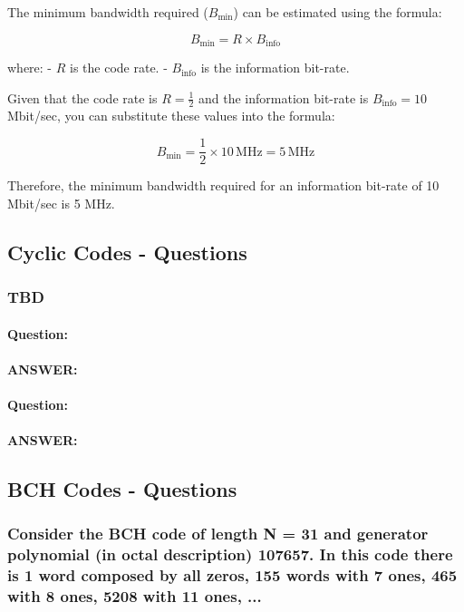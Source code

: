 \documentclass[colorlinks,11pt,a4paper,normalphoto,withhyper,ragged2e]{altareport}
\begin{document}
		
		The minimum bandwidth required (\( B_{\text{min}} \)) can be estimated using the formula:
		
		\[ B_{\text{min}} = R \times B_{\text{info}} \]
		
		where:
		- \( R \) is the code rate.
		- \( B_{\text{info}} \) is the information bit-rate.
		
		Given that the code rate is \( R = \frac{1}{2} \) and the information bit-rate is \( B_{\text{info}} = 10 \) Mbit/sec, you can substitute these values into the formula:
		
		\[ B_{\text{min}} = \frac{1}{2} \times 10 \, \text{MHz} = 5 \, \text{MHz} \]
		
		Therefore, the minimum bandwidth required for an information bit-rate of 10 Mbit/sec is 5 MHz.
		
		
		
		
		
		
		
		
		\subsection{Cyclic Codes - Questions}
			
			\subsubsection{TBD}
				
				
				\paragraph{Question: }
				\paragraph{ANSWER:}
				
				
				
				\paragraph{Question: }
				\paragraph{ANSWER:}
			
			
		\subsection{BCH Codes - Questions}
			
			\subsubsection{Consider the BCH code of length N = 31 and generator polynomial (in octal description) 107657. In this code there is 1 word composed by all zeros, 155 words with 7 ones, 465 with 8 ones, 5208 with 11 ones, ...}
				
\end{document}
